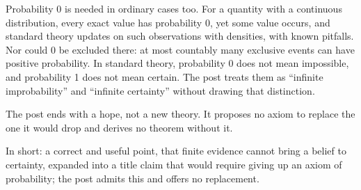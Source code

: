 \begin{afterword}
Probability 0 is needed in ordinary cases too. For a quantity with a continuous distribution, every exact value has probability 0, yet some value occurs, and standard theory updates on such observations with densities, with known pitfalls. Nor could 0 be excluded there: at most countably many exclusive events can have positive probability. In standard theory, probability 0 does not mean impossible, and probability 1 does not mean certain. The post treats them as ``infinite improbability'' and ``infinite certainty'' without drawing that distinction.

The post ends with a hope, not a new theory. It proposes no axiom to replace the one it would drop and derives no theorem without it.

In short: a correct and useful point, that finite evidence cannot bring a belief to certainty, expanded into a title claim that would require giving up an axiom of probability; the post admits this and offers no replacement.
\end{afterword}
